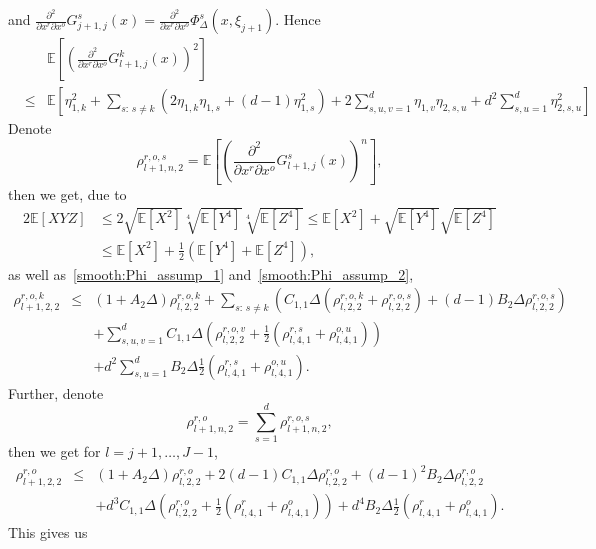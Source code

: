 \documentclass[11pt,a4paper]{amsart}
\theoremstyle{plain}
\theoremstyle{definition}
\theoremstyle{remark}
\numberwithin{equation}{section}
\newcommand*{\EE}{\mathbb E}
\renewcommand*{\doteq}{:=}
\begin{document}
and $\frac{\partial^2}{\partial x^r\partial x^o}G_{j+1,j}^s(x)=\frac{\partial^2}{\partial x^r\partial x^o}\Phi_{\Delta}^s\left(x,\xi_{j+1}\right)$.
Hence 
\begin{eqnarray*}
&&\EE\left[\left(\frac{\partial^2}{\partial x^r\partial x^o}G_{l+1,j}^k(x)\right)^{2}\right]\\
&\leq&\EE\left[\eta_{1,k}^2+\sum_{s:\,s\neq k}\left(2\eta_{1,k}\eta_{1,s}+(d-1)\eta_{1,s}^2\right)+2\sum_{s,u,v=1}^d\eta_{1,v}\eta_{2,s,u}+d^2\sum_{s,u=1}^d\eta_{2,s,u}^2\right]
\end{eqnarray*}
Denote 
\[
\rho_{l+1,n,2}^{r,o,s}=\EE\left[\left(\frac{\partial^2}{\partial x^r\partial x^o}G_{l+1,j}^s(x)\right)^{n}\right],
\]
then we get, due to 
\begin{align*}
2\EE\left[XYZ\right]&\le 2\sqrt{\EE\left[X^2\right]}\sqrt[4]{\EE\left[Y^4\right]}\sqrt[4]{\EE\left[Z^4\right]}\le \EE\left[X^2\right]+\sqrt{\EE\left[Y^4\right]}\sqrt{\EE\left[Z^4\right]}\\
&\le \EE\left[X^2\right]+\frac{1}{2}\left(\EE\left[Y^4\right]+\EE\left[Z^4\right]\right),
\end{align*}
as well as~\eqref{smooth:Phi_assump_1} and~\eqref{smooth:Phi_assump_2},
\begin{eqnarray*}
\rho_{l+1,2,2}^{r,o,k} & \leq & (1+A_{2}\Delta)\rho_{l,2,2}^{r,o,k}
+\sum_{s:\,s\neq k}\left(C_{1,1}\Delta(\rho_{l,2,2}^{r,o,k}+\rho_{l,2,2}^{r,o,s})+(d-1)B_{2}\Delta\rho_{l,2,2}^{r,o,s}\right)\\
&&+\sum_{s,u,v=1}^d C_{1,1}\Delta\left(\rho_{l,2,2}^{r,o,v}+\frac{1}{2}\left(\rho_{l,4,1}^{r,s}+\rho_{l,4,1}^{o,u}\right)\right)\\
&&+d^2\sum_{s,u=1}^dB_{2}\Delta\frac{1}{2}\left(\rho_{l,4,1}^{r,s}+\rho_{l,4,1}^{o,u}\right).
\end{eqnarray*}
Further, denote 
\[
\rho_{l+1,n,2}^{r,o}=\sum_{s=1}^d\rho_{l+1,n,2}^{r,o,s},
\]
then we get for $l=j+1,\ldots,J-1$,
\begin{eqnarray*}
\rho_{l+1,2,2}^{r,o} & \leq & (1+A_{2}\Delta)\rho_{l,2,2}^{r,o}
+2(d-1)C_{1,1}\Delta\rho_{l,2,2}^{r,o}+(d-1)^2B_{2}\Delta\rho_{l,2,2}^{r,o}\\
&&+d^3C_{1,1}\Delta\left(\rho_{l,2,2}^{r,o}+\frac{1}{2}\left(\rho_{l,4,1}^{r}+\rho_{l,4,1}^{o}\right)\right)+d^4B_2\Delta\frac{1}{2}\left(\rho_{l,4,1}^{r}+\rho_{l,4,1}^{o}\right).
\end{eqnarray*}
This gives us
\end{document}
